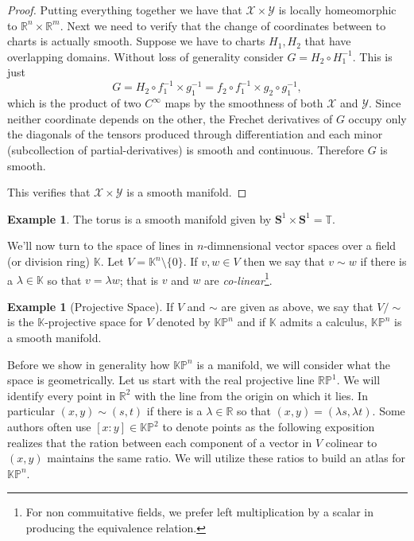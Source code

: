 \documentclass[11pt]{amsart}
\theoremstyle{definition}
\newtheorem{example}[definition]{Example}
\def\sphere{{\pmb S}}
\def\projspace{{ \mathbb{K}\mathbb{P} }}
\def\scriptx{{\mathcal X}}
\def\scripty{{\mathcal Y}}
\begin{document}
\begin{proof}
	Putting everything together we have that $\scriptx \times \scripty$ is locally homeomorphic to $\mathbb{R}^n \times \mathbb{R}^m.$ Next we need to verify that the change of coordinates between to charts is actually smooth. Suppose we have to charts $H_1, H_2$ that have overlapping domains. Without loss of generality consider $G = H_2 \circ H_1^{-1}.$ This is just
	\begin{equation*}
		G = H_2 \circ f_1^{-1}\times g_1^{-1} = f_2 \circ f_1^{-1}\times  g_2 \circ g_1^{-1},
	\end{equation*}
	which is the product of two $C^{\infty}$ maps by the smoothness of both $\scriptx$ and $\scripty.$ Since neither coordinate depends on the other, the Frechet derivatives of $G$ occupy only the diagonals of the tensors produced through differentiation and each minor (subcollection of partial-derivatives) is smooth and continuous. Therefore $G$ is smooth.

	This verifies that $\scriptx \times \scripty$ is a smooth manifold.
\end{proof}

\begin{example}
	The torus is a smooth manifold given by $\sphere^1 \times \sphere^1 = \mathbb{T}$.
\end{example}
We'll now turn to the space of lines in $n$-dimnensional vector spaces over a field (or division ring) $\mathbb{K}.$ Let $V = \mathbb{K}^n \setminus \{0\}.$ If $v,w \in V$ then we say that $v \sim w$ if there is a $\lambda \in \mathbb{K}$ so that $v = \lambda w$; that is $v$ and $w$ are \emph{co-linear}\footnote{For non commuitative fields, we prefer left multiplication by a scalar in producing the equivalence relation.}.

\begin{example}[Projective Space]
	If $V$ and $\sim$ are given as above, we say that $V/\sim~$ is the $\mathbb{K}$-projective space for $V$ denoted by $\mathbb{K} \mathbb{P}^n$ and if $\mathbb{K}$ admits a calculus, $\mathbb{K} \mathbb{P}^n$ is a smooth manifold.
\end{example}


Before we show in generality how $\projspace^n$ is a manifold, we will consider what the space is geometrically. Let us start with the real projective line $\mathbb{R}\mathbb{P}^1.$ We will identify every point in $\mathbb{R}^2$ with the line from the origin on which it lies. In particular $(x,y) \sim (s,t)$ if there is a $\lambda \in \mathbb{R}$ so that $(x,y) = (\lambda s, \lambda t).$ Some authors often use $[x : y] \in \projspace^2$ to denote points as the following exposition realizes that the ration between each component of a vector in $V$ colinear to $(x,y)$ maintains the same ratio. We will utilize these ratios to build an atlas for $\projspace^n$.
\end{document}
